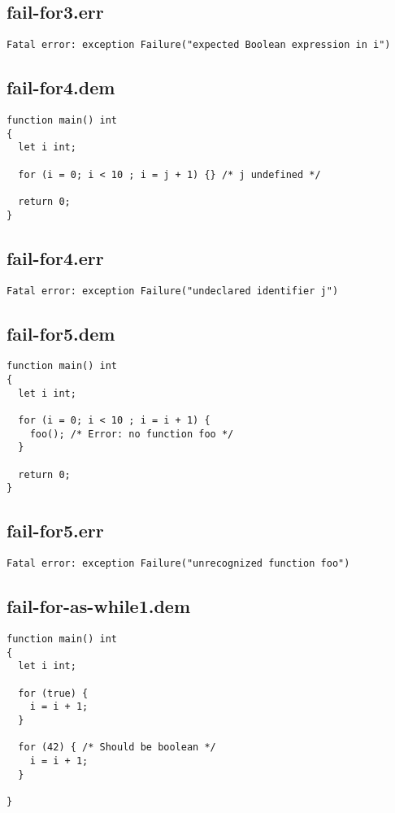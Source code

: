 \subsection{fail-for3.err}
\begin{lstlisting}
Fatal error: exception Failure("expected Boolean expression in i")
\end{lstlisting}
\subsection{fail-for4.dem}
\begin{lstlisting}
function main() int
{
  let i int;

  for (i = 0; i < 10 ; i = j + 1) {} /* j undefined */

  return 0;
}
\end{lstlisting}
\subsection{fail-for4.err}
\begin{lstlisting}
Fatal error: exception Failure("undeclared identifier j")
\end{lstlisting}
\subsection{fail-for5.dem}
\begin{lstlisting}
function main() int
{
  let i int;

  for (i = 0; i < 10 ; i = i + 1) {
    foo(); /* Error: no function foo */
  }

  return 0;
}
\end{lstlisting}
\subsection{fail-for5.err}
\begin{lstlisting}
Fatal error: exception Failure("unrecognized function foo")
\end{lstlisting}
\subsection{fail-for-as-while1.dem}
\begin{lstlisting}
function main() int
{
  let i int;

  for (true) {
    i = i + 1;
  }

  for (42) { /* Should be boolean */
    i = i + 1;
  }

}
\end{lstlisting}
